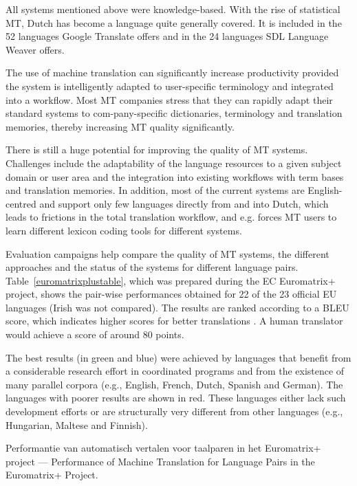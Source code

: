 \documentclass{scrartcl}
\begin{document}
\begin{Parallel}[c]{70mm}{70mm}
{    All systems mentioned above were knowledge-based. With the rise of statistical MT, Dutch has become a language quite generally covered. It is included in the 52 languages Google Translate offers and in the 24 languages SDL Language Weaver offers.

    The use of machine translation can significantly increase productivity provided the system is intelligently adapted to user-specific terminology and integrated into a workflow. Most MT companies stress that they can rapidly adapt their standard systems to com-pany-specific dictionaries, terminology and translation memories, thereby increasing MT quality significantly.

    There is still a huge potential for improving the quality of MT systems. Challenges include the adaptability of the language resources to a given subject domain or user area and the integration into existing workflows with term bases and translation memories. In addition, most of the current systems are English-centred and support only few languages directly from and into Dutch, which leads to frictions in the total translation workflow, and e.g. forces MT users to learn different lexicon coding tools for different systems.

    Evaluation campaigns help compare the quality of MT systems, the different approaches and the status of the systems for different language pairs. Table~\ref{euromatrixplustable}, which was prepared during the EC Euromatrix+ project, shows the pair-wise performances obtained for 22 of the 23 official EU languages (Irish was not compared). The results are ranked according to a BLEU score, which indicates higher scores for better translations \cite{bleu1}.   A human translator would achieve a score of around 80 points.

    The best results (in green and blue) were achieved by languages that benefit from a considerable research effort in coordinated programs and from the existence of many parallel corpora (e.g., English, French, Dutch, Spanish and German). The languages with poorer results are shown in red. These languages either lack such development efforts or are structurally very different from other languages (e.g., Hungarian, Maltese and Finnish).



  }

  \ParallelPar

\begin{table}
\caption{Performantie van automatisch vertalen voor taalparen in het Euromatrix+ project --- Performance of Machine Translation for Language Pairs in the Euromatrix+ Project.}
\label{euromatrixplustable}
\end{table}



\end{Parallel}
\end{document}
